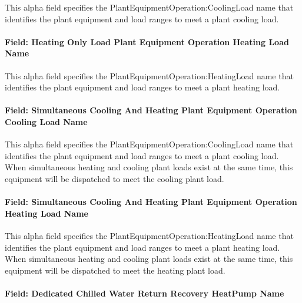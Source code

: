 This alpha field specifies the PlantEquipmentOperation:CoolingLoad name that identifies the plant equipment and load ranges to meet a plant cooling load.

\paragraph{Field: Heating Only Load Plant Equipment Operation Heating Load Name}\label{field-heat-only-load-equip-operation-name-plantequipmentoperationchillerheaterchangeover}

This alpha field specifies the PlantEquipmentOperation:HeatingLoad name that identifies the plant equipment and load ranges to meet a plant heating load.

\paragraph{Field: Simultaneous Cooling And Heating Plant Equipment Operation Cooling Load Name}\label{field-cool-only-load-equip-operation-name-plantequipmentoperationchillerheaterchangeover}

This alpha field specifies the PlantEquipmentOperation:CoolingLoad name that identifies the plant equipment and load ranges to meet a plant cooling load. When simultaneous heating and cooling plant loads exist at the same time, this equipment will be dispatched to meet the cooling plant load.

\paragraph{Field: Simultaneous Cooling And Heating Plant Equipment Operation Heating Load Name}\label{field-heat-only-load-equip-operation-name-plantequipmentoperationchillerheaterchangeover}

This alpha field specifies the PlantEquipmentOperation:HeatingLoad name that identifies the plant equipment and load ranges to meet a plant heating load. When simultaneous heating and cooling plant loads exist at the same time, this equipment will be dispatched to meet the heating plant load.

\paragraph{Field: Dedicated Chilled Water Return Recovery HeatPump Name}\label{field-dedicated-chilled-return-recovery-hp-name-plantequipmentoperationchillerheaterchangeover}

